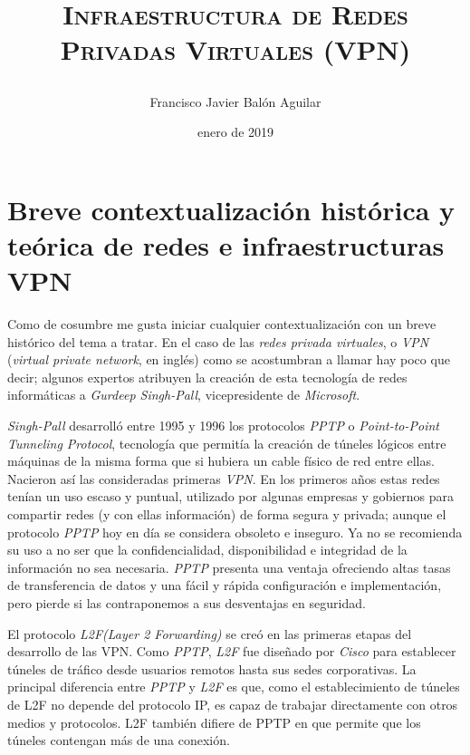 \documentclass[a4paper, 11pt, titlepage]{article}
\title{{\scshape\Huge Infraestructura de Redes Privadas Virtuales (VPN) \par}}
\author{Francisco Javier Balón Aguilar}
\date{enero de 2019}
\begin{document}
\maketitle
\renewcommand{\contentsname}{Índice}
\tableofcontents
\listoffigures

\newpage

\section{Breve contextualización histórica y teórica de redes e infraestructuras VPN}

    Como de cosumbre me gusta iniciar cualquier contextualización con un breve histórico del
    tema a tratar. En el caso de las \textit{redes privada virtuales}, o \textit{VPN} 
    (\textit{virtual private network}, en inglés) como se acostumbran a llamar hay poco que
    decir; algunos expertos atribuyen la creación de esta tecnología de redes informáticas a
    \textit{Gurdeep Singh-Pall}, vicepresidente de \textit{Microsoft}. 

    \textit{Singh-Pall} desarrolló entre 1995 y 1996 los protocolos \textit{PPTP} o \textit{
    Point-to-Point Tunneling Protocol}, tecnología que permitía la creación de túneles lógicos
    entre máquinas de la misma forma que si hubiera un cable físico de red entre ellas. Nacieron
    así las consideradas primeras \textit{VPN}. En los primeros años estas redes tenían un uso escaso 
    y puntual, utilizado por algunas empresas y gobiernos para compartir redes (y con ellas información) 
    de forma segura y privada; aunque el protocolo \textit{PPTP} hoy en día se considera obsoleto e 
    inseguro. Ya no se recomienda su uso a no ser que la confidencialidad, disponibilidad e integridad de
    la información no sea necesaria. \textit{PPTP} presenta una ventaja ofreciendo altas tasas de 
    transferencia de datos y una fácil y rápida configuración e implementación, pero pierde si las 
    contraponemos a sus desventajas en seguridad.
    
    El protocolo \textit{L2F(Layer 2 Forwarding)} se creó en las primeras etapas del desarrollo de las VPN.
    Como \textit{PPTP}, \textit{L2F} fue diseñado por \textit{Cisco} para establecer túneles de tráfico desde 
    usuarios remotos hasta sus sedes corporativas. La principal diferencia entre \textit{PPTP} y \textit{L2F} 
    es que, como el establecimiento de túneles de L2F no depende del protocolo IP, es capaz de trabajar directamente
    con otros medios y protocolos. L2F también difiere de PPTP en que permite que los túneles contengan más 
    de una conexión. 
\end{document}
